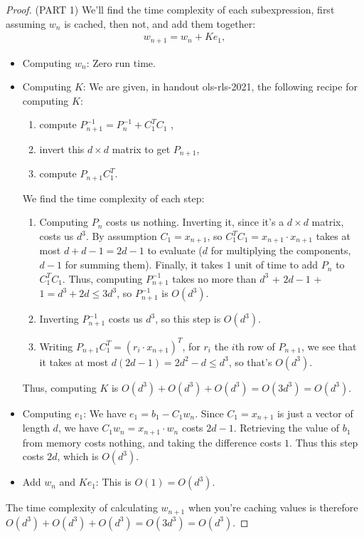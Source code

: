 \documentclass[12pt]{article}
\newcommand\inv[1]{#1^{-1}}
\begin{document}
\begin{proof}
  (PART 1) We'll find the time complexity of each subexpression, first assuming $w_n$ is cached, then not, and add them together:
  \begin{align*}
    w_{n+1} = w_{n} +Ke_1,
  \end{align*}
  \begin{itemize}
  \item
    Computing $w_n$: Zero run time.
  \item
    Computing $K$: We are given, in handout ols-rls-2021, the following recipe for computing $K$: 
  \begin{enumerate}
  \item
    compute $\inv{P}_{n+1} = \inv{P}_n + C_1^TC_1$ ,
  \item
    invert this $d \times d$ matrix to get $P_{n+1}$,
  \item
    compute $P_{n+1}C_1^T$.
  \end{enumerate}
  We find the time complexity of each step:
  \begin{enumerate}
  \item
    Computing  $P_n$ costs us nothing. Inverting it, since it's a $d \times d$ matrix, costs us $d^3$. By assumption $C_1 = x_{n+1}$, so $C_1^T C_1 = x_{n+1} \cdot x_{n+1}$ takes at most $d+ d-1 = 2d-1$ to evaluate ($d$ for multiplying the components, $d-1$ for summing them). Finally, it takes $1$ unit of time to add $P_n$ to $C_1^T C_1$. Thus, computing $P_{n+1}^{-1}$ takes no more than $d^3$ + $2d-1$ + $1= d^3 + 2d \leq 3d^3$, so $\inv{P}_{n+1}$ is $O(d^3)$.
  \item
    Inverting $P_{n+1}^{-1}$ costs us $d^3$, so this step is $O(d^3)$.
  \item
    Writing $P_{n+1}C_1^T = (r_i \cdot x_{n+1})^T$, for $r_i$ the $i$th row of $P_{n+1}$, we see that it takes at most $d(2d-1) = 2d^2-d \leq d^3$, so that's $O(d^3)$. 
  \end{enumerate}
  Thus, computing $K$ is $O(d^3) + O(d^3) + O(d^3) = O(3d^3) = O(d^3)$.
\item Computing $e_1$:
  We have $e_1 = b_1 - C_1 w_n$. Since $C_1 = x_{n+1}$ is just a vector of length $d$, we have $C_1 w_n = x_{n+1} \cdot w_n$ costs $2d-1$. Retrieving the value of $b_1$ from memory costs nothing, and taking the difference costs $1$. Thus this step costs
  $2d$, which is $O(d^3)$.
\item
  Add
  $w_n$ and $Ke_1$: This is $O(1)=O(d^3)$.
  \end{itemize}
  The time complexity of calculating $w_{n+1}$ when you're caching values is therefore $O(d^3) + O(d^3) + O(d^3) = O(3d^3) = O(d^3)$.

\end{proof}
\end{document}
